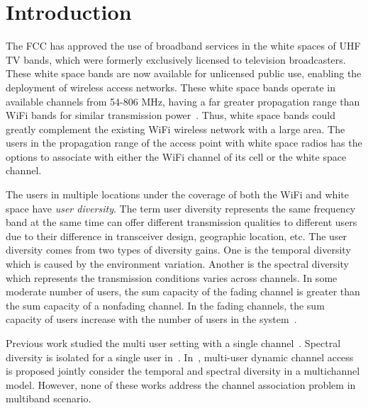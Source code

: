 \section{Introduction}
\label{sec:introduction}

The FCC has approved the use of broadband services in the white spaces of 
UHF TV bands, which were formerly exclusively licensed to television broadcasters.
These white space bands are now available for unlicensed public use, enabling the
deployment of wireless access networks. These white space bands operate in available 
channels from 54-806 MHz, having a far greater propagation range than WiFi bands for 
similar transmission power~\cite{balanis2012antenna}. 
Thus, white space bands could greatly complement the existing WiFi wireless network with 
a large area. The users in the propagation range of the access point with white space radios 
has the options to associate with either the WiFi channel of its cell or the white space 
channel.



The users in multiple locations under the coverage of both the WiFi and white space have {\it user 
diversity}. The term user diversity represents the same frequency band at the same time can offer 
different transmission qualities to different users due to their difference in transceiver design, 
geographic location, etc.
The user diversity comes from two types of diversity gains. One is the temporal diversity which 
is caused by the environment variation. Another is the spectral diversity which represents the 
transmission conditions varies across channels. 
In some moderate number of users, the sum capacity of the fading channel is greater than 
the sum capacity of a nonfading channel. In the fading channels, the sum capacity of users 
increase with the number of users in the system~\cite{viswanath2002opportunistic,gan2014multiple}. 



Previous work studied the multi user setting with a single channel~\cite{tan2010distributed}. Spectral diversity 
is isolated for a single user in~\cite{shu2009throughput}. In~\cite{liu2013stay}, multi-user dynamic channel access is 
proposed jointly consider the temporal and spectral diversity in a multichannel model. However, 
none of these works address the channel association problem in multiband scenario.

